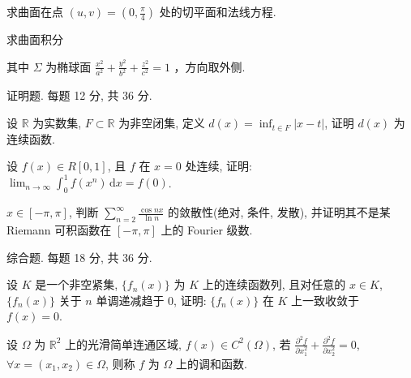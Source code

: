 求曲面在点 $(u, v) = \left(0, \frac{\pi}{4}\right)$ 处的切平面和法线方程.\par
\par{}
求曲面积分\par
\nopagebreak[4]
其中  $\Sigma$  为椭球面  $\frac{x^{2}}{a^{2}} + \frac{y^{2}}{b^{2}} + \frac{z^{2}}{c^{2}} = 1$ ，方向取外侧.\par
\par{}
证明题. 每题 12 分, 共 36 分.\par
设 $\mathbb{R}$ 为实数集, $F \subset \mathbb{R}$ 为非空闭集, 定义 $d(x) = \inf_{t \in F} |x - t|$, 证明 $d(x)$ 为连续函数.\par
设 $f(x) \in R[0,1]$, 且 $f$ 在 $x = 0$ 处连续, 证明: $\lim_{n \to \infty} \int_0^1 f(x^n) \, \mathrm{d}x = f(0)$.\par
$x \in [-\pi, \pi]$, 判断 $\sum_{n=2}^{\infty} \frac{\cos nx}{\ln n}$ 的敛散性(绝对, 条件, 发散), 并证明其不是某 Riemann 可积函数在 $[- \pi, \pi]$ 上的 Fourier 级数.\par
\par{}
综合题. 每题 18 分, 共 36 分.\par
设 $K$ 是一个非空紧集, $\{f_n(x)\}$ 为 $K$ 上的连续函数列, 且对任意的 $x \in K$, $\{f_n(x)\}$ 关于 $n$ 单调递减趋于 0, 证明: $\{f_n(x)\}$ 在 $K$ 上一致收敛于 $f(x) = 0$.\par
设 $\Omega$ 为 $\mathbb{R}^2$ 上的光滑简单连通区域, $f(x) \in C^2(\Omega)$, 若 $\frac{\partial^2 f}{\partial x_1^2} + \frac{\partial^2 f}{\partial x_2^2} = 0$, $\forall x = (x_1, x_2) \in \Omega$, 则称 $f$ 为 $\Omega$ 上的调和函数.\par
